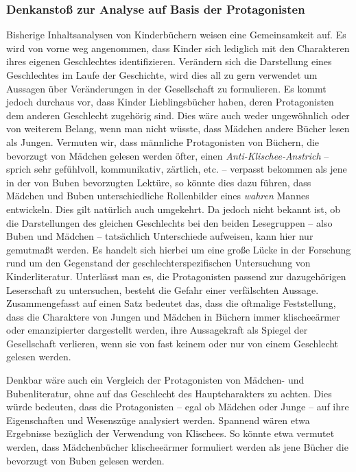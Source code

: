     \subsubsection{Denkanstoß zur Analyse auf Basis der Protagonisten}

      Bisherige Inhaltsanalysen von Kinderbüchern weisen eine Gemeinsamkeit auf.
      Es wird von vorne weg angenommen, dass Kinder sich lediglich mit den
      Charakteren ihres eigenen Geschlechtes identifizieren. Verändern sich die
      Darstellung eines Geschlechtes im Laufe der Geschichte, wird dies all zu
      gern verwendet um Aussagen über Veränderungen in der Gesellschaft zu
      formulieren. Es kommt jedoch durchaus vor, dass Kinder Lieblingsbücher
      haben, deren Protagonisten dem anderen Geschlecht zugehörig sind. Dies
      wäre auch weder ungewöhnlich oder von weiterem Belang, wenn man nicht
      wüsste, dass Mädchen andere Bücher lesen als Jungen. Vermuten wir, dass
      männliche Protagonisten von Büchern, die bevorzugt von Mädchen gelesen
      werden öfter, einen \emph{Anti-Klischee-Anstrich} -- sprich sehr
      gefühlvoll, kommunikativ, zärtlich, etc. -- verpasst bekommen als jene in
      der von Buben bevorzugten Lektüre, so könnte dies dazu führen, dass
      Mädchen und Buben unterschiedliche Rollenbilder eines \emph{wahren} Mannes
      entwickeln. Dies gilt natürlich auch umgekehrt. Da jedoch nicht bekannt
      ist, ob die Darstellungen des gleichen Geschlechts bei den beiden
      Lesegruppen -- also Buben und Mädchen -- tatsächlich Unterschiede
      aufweisen, kann hier nur gemutmaßt werden. Es handelt sich hierbei um eine
      große Lücke in der Forschung rund um den Gegenstand der
      geschlechterspezifischen Untersuchung von Kinderliteratur. Unterlässt man
      es, die Protagonisten passend zur dazugehörigen Leserschaft zu
      untersuchen, besteht die Gefahr einer verfälschten Aussage.
      Zusammengefasst auf einen Satz bedeutet das, dass die oftmalige
      Feststellung, dass die Charaktere von Jungen und Mädchen in Büchern immer
      klischeeärmer oder emanzipierter dargestellt werden, ihre Aussagekraft als
      Spiegel der Gesellschaft verlieren, wenn sie von fast keinem oder nur von
      einem Geschlecht gelesen werden.

      Denkbar wäre auch ein Vergleich der Protagonisten von Mädchen- und
      Bubenliteratur, ohne auf das Geschlecht des Hauptcharakters zu achten.
      Dies würde bedeuten, dass die Protagonisten -- egal ob Mädchen oder Junge
      -- auf ihre Eigenschaften und Wesenszüge analysiert werden. Spannend wären
      etwa Ergebnisse bezüglich der Verwendung von Klischees. So könnte etwa
      vermutet werden, dass Mädchenbücher klischeeärmer formuliert werden als
      jene Bücher die bevorzugt von Buben gelesen werden.

